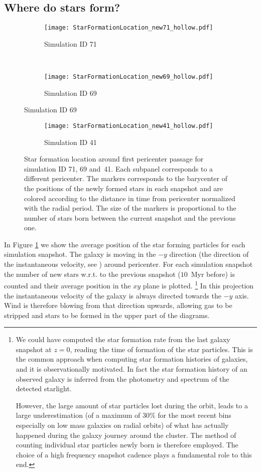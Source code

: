 \subsection{Where do stars form?}
\begin{figure}
\centering
\begin{subfigure}[t]{0.83\textwidth}
\centering
\caption{Simulation ID 71}
\texttt{[image: StarFormationLocation\_new71\_hollow.pdf]}
\end{subfigure}\\%
\begin{subfigure}[t]{0.83\textwidth}
\centering
\caption{Simulation ID 69}
\texttt{[image: StarFormationLocation\_new69\_hollow.pdf]}
\end{subfigure}
\label{fig:sf_location}
\end{figure}
\begin{figure}[ht]
\centering
\ContinuedFloat %
\begin{subfigure}{0.83\textwidth}
\caption{Simulation ID 41}
\texttt{[image: StarFormationLocation\_new41\_hollow.pdf]}
\end{subfigure}
\caption{Star formation location around first pericenter passage for simulation ID 71, 69 and~41.
Each subpanel corresponds to a different pericenter.
The markers corresponds to the barycenter of the positions of the newly formed stars in each snapshot and are colored according to the distance in time from pericenter normalized with the radial period.
The size of the markers is proportional to the number of stars born between the current snapshot and the previous one.}
\end{figure}
In Figure \ref{fig:sf_location} we show the average position of the star forming particles for each simulation snapshot.
The galaxy is moving in the $-y$ direction (the direction of the instantaneous velocity, see ) around pericenter.
For each simulation snapshot the number of new stars w.r.t. to the previous snapshot ($10$~Myr before) is counted and their average position in the $xy$ plane is plotted.
\footnote{
We could have computed the star formation rate from the last galaxy snapshot at $z=0$, reading the time of formation of the star particles.
This is the common approach %
when computing star formation histories of galaxies, and it is observationally motivated.
In fact the star formation history of an observed galaxy is inferred from the photometry and spectrum of the detected starlight.

However, the large amount of star particles lost during the orbit, leads to a large underestimation (of a maximum of 30\% for the most recent bins especially on low mass galaxies on radial orbits) of what has actually happened during the galaxy journey around the cluster.
The method of counting individual star particles newly born is therefore employed.
The choice of a high frequency snapshot cadence plays a fundamental role to this end.
}
In this projection the instantaneous velocity of the galaxy is always directed towards the $-y$ axis.
Wind is therefore blowing from that direction upwards, allowing gas to be stripped and stars to be formed in the upper part of the diagrams.

